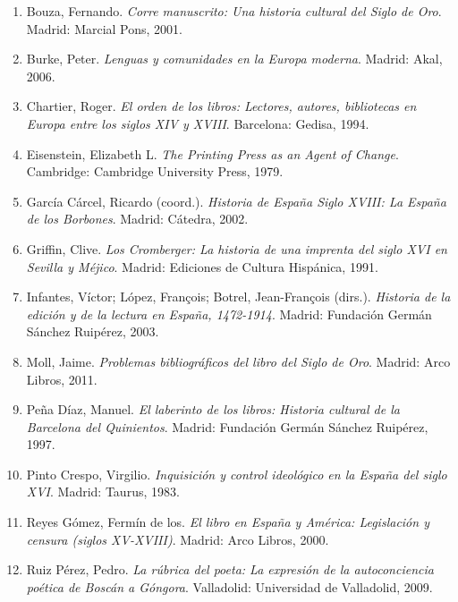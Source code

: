 \documentclass[12pt,a4paper]{article}
\begin{document}
\begin{enumerate}
    \item Bouza, Fernando. \textit{Corre manuscrito: Una historia cultural del Siglo de Oro}. Madrid: Marcial Pons, 2001.

    \item Burke, Peter. \textit{Lenguas y comunidades en la Europa moderna}. Madrid: Akal, 2006.

    \item Chartier, Roger. \textit{El orden de los libros: Lectores, autores, bibliotecas en Europa entre los siglos XIV y XVIII}. Barcelona: Gedisa, 1994.

    \item Eisenstein, Elizabeth L. \textit{The Printing Press as an Agent of Change}. Cambridge: Cambridge University Press, 1979.

    \item García Cárcel, Ricardo (coord.). \textit{Historia de España Siglo XVIII: La España de los Borbones}. Madrid: Cátedra, 2002.

    \item Griffin, Clive. \textit{Los Cromberger: La historia de una imprenta del siglo XVI en Sevilla y Méjico}. Madrid: Ediciones de Cultura Hispánica, 1991.

    \item Infantes, Víctor; López, François; Botrel, Jean-François (dirs.). \textit{Historia de la edición y de la lectura en España, 1472-1914}. Madrid: Fundación Germán Sánchez Ruipérez, 2003.

    \item Moll, Jaime. \textit{Problemas bibliográficos del libro del Siglo de Oro}. Madrid: Arco Libros, 2011.

    \item Peña Díaz, Manuel. \textit{El laberinto de los libros: Historia cultural de la Barcelona del Quinientos}. Madrid: Fundación Germán Sánchez Ruipérez, 1997.

    \item Pinto Crespo, Virgilio. \textit{Inquisición y control ideológico en la España del siglo XVI}. Madrid: Taurus, 1983.

    \item Reyes Gómez, Fermín de los. \textit{El libro en España y América: Legislación y censura (siglos XV-XVIII)}. Madrid: Arco Libros, 2000.

    \item Ruiz Pérez, Pedro. \textit{La rúbrica del poeta: La expresión de la autoconciencia poética de Boscán a Góngora}. Valladolid: Universidad de Valladolid, 2009.
\end{enumerate}
\end{document}
